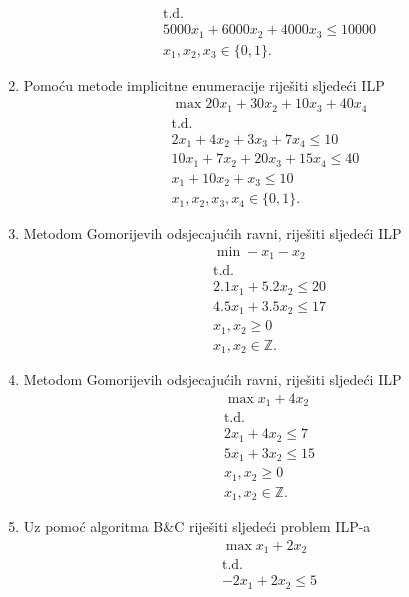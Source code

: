 \documentclass[a4paper, utf8, 11pt, colorlinks]{book}
\theoremstyle{definition}
\begin{document}
\begin{enumerate}
\begin{align*}
  &\mbox{t.d.} \\
  & 5000 x_1 + 6000 x_2 + 4000 x_3 \leq 10000 \\
  & x_1, x_2, x_3 \in \{0, 1\}.
\end{align*}
\item  Pomoću metode implicitne enumeracije riješiti sljedeći ILP
\begin{align*}
	 &\max 20 x_1 + 30 x_2 + 10 x_3 + 40 x_4 \\
	 &\mbox{t.d.}\\
	 & 2x_1 + 4 x_2 + 3 x_3 + 7 x_4 \leq 10 \\
	 & 10 x_1 + 7 x_2 + 20 x_3 + 15 x_4 \leq 40 \\
	 & x_1 + 10 x_2 + x_3 \leq 10 \\
	 & x_1, x_2, x_3, x_4 \in \{0, 1\}.
\end{align*}
	\item Metodom Gomorijevih odsjecajućih ravni, riješiti sljedeći ILP%
	\begin{align*}
		 &\min -x_1 - x_2 \\
		 &\mbox{t.d.}\\
		 & 2.1 x_1 + 5.2x_2 \leq 20 \\
		 & 4.5 x_1 + 3.5 x_2 \leq 17 \\
		 & x_1, x_2 \geq 0 \\
		 & x_1, x_2 \in \mathbb{Z}.
	\end{align*}
\item Metodom Gomorijevih odsjecajućih ravni, riješiti sljedeći ILP%
\begin{align*}
	& \max x_1 + 4 x_2 \\
	& \mbox{t.d.} \\
	& 2 x_1 + 4 x_2 \leq 7 \\
	& 5 x_1 + 3 x_2 \leq 15 \\
	& x_1, x_2 \geq 0 \\
	& x_1, x_2 \in \mathbb{Z}.
	\end{align*}
\item    %
  Uz pomoć algoritma B\&C riješiti sljedeći problem ILP-a
  \begin{align*}
  	 &\max x_1 + 2 x_2 \\
  	 &\mbox{t.d.} \\
  	 & -2x_1 + 2 x_2 \leq 5 \\

\end{align*}
\end{enumerate}
\end{document}
